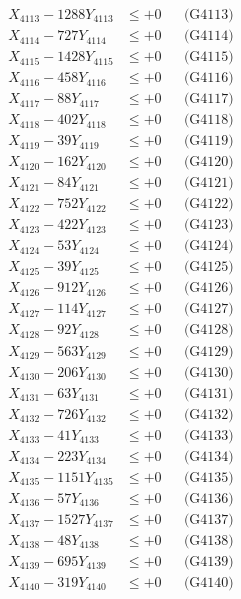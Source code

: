 \documentclass[a4paper,10pt]{article}
\begin{document}
{\begin{align}
X_{4113} - 1288Y_{4113} &\leq +0 && \text{(G4113)} \\
X_{4114} - 727Y_{4114} &\leq +0 && \text{(G4114)} \\
X_{4115} - 1428Y_{4115} &\leq +0 && \text{(G4115)} \\
X_{4116} - 458Y_{4116} &\leq +0 && \text{(G4116)} \\
X_{4117} - 88Y_{4117} &\leq +0 && \text{(G4117)} \\
X_{4118} - 402Y_{4118} &\leq +0 && \text{(G4118)} \\
X_{4119} - 39Y_{4119} &\leq +0 && \text{(G4119)} \\
X_{4120} - 162Y_{4120} &\leq +0 && \text{(G4120)} \\
\allowbreak
X_{4121} - 84Y_{4121} &\leq +0 && \text{(G4121)} \\
X_{4122} - 752Y_{4122} &\leq +0 && \text{(G4122)} \\
X_{4123} - 422Y_{4123} &\leq +0 && \text{(G4123)} \\
X_{4124} - 53Y_{4124} &\leq +0 && \text{(G4124)} \\
X_{4125} - 39Y_{4125} &\leq +0 && \text{(G4125)} \\
X_{4126} - 912Y_{4126} &\leq +0 && \text{(G4126)} \\
X_{4127} - 114Y_{4127} &\leq +0 && \text{(G4127)} \\
X_{4128} - 92Y_{4128} &\leq +0 && \text{(G4128)} \\
X_{4129} - 563Y_{4129} &\leq +0 && \text{(G4129)} \\
X_{4130} - 206Y_{4130} &\leq +0 && \text{(G4130)} \\
\allowbreak
X_{4131} - 63Y_{4131} &\leq +0 && \text{(G4131)} \\
X_{4132} - 726Y_{4132} &\leq +0 && \text{(G4132)} \\
X_{4133} - 41Y_{4133} &\leq +0 && \text{(G4133)} \\
X_{4134} - 223Y_{4134} &\leq +0 && \text{(G4134)} \\
X_{4135} - 1151Y_{4135} &\leq +0 && \text{(G4135)} \\
X_{4136} - 57Y_{4136} &\leq +0 && \text{(G4136)} \\
X_{4137} - 1527Y_{4137} &\leq +0 && \text{(G4137)} \\
X_{4138} - 48Y_{4138} &\leq +0 && \text{(G4138)} \\
X_{4139} - 695Y_{4139} &\leq +0 && \text{(G4139)} \\
X_{4140} - 319Y_{4140} &\leq +0 && \text{(G4140)} \\

\end{align}}
\end{document}
